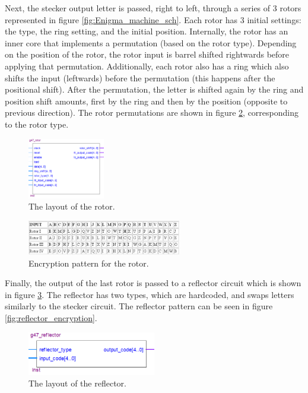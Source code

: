 \documentclass[10pt]{article}
\begin{document}
\newline
Next, the stecker output letter is passed, right to left, through a series of 3 rotors represented in figure \ref{fig:Enigma_machine_sch}. Each rotor has 3 initial settings: the type, the ring setting, and the initial position. Internally, the rotor has an inner core that implements a permutation (based on the rotor type). Depending on the position of the rotor, the rotor input is barrel shifted rightwards before applying that permutation. Additionally, each rotor also has a ring which also shifts the input (leftwards) before the permutation (this happens after the positional shift). After the permutation, the letter is shifted again by the ring and position shift amounts, first by the ring and then by the position (opposite to previous direction). The rotor permutations are shown in figure \ref{fig:rotor_encryption}, corresponding to the rotor type.
\begin{figure}[!htb]
    \centering
    \includegraphics[width=0.3\textwidth]{./rotor_layout.png}
    \caption{The layout of the rotor.}
    \label{fig:rotor_layout}
\end{figure}
\begin{figure}[!htb]
    \centering
    \includegraphics[width=0.6\textwidth]{./rotor_encryption.png}
    \caption{Encryption pattern for the rotor.}
    \label{fig:rotor_encryption}
\end{figure}
\newpage
Finally, the output of the last rotor is passed to a reflector circuit which is shown in figure \ref{fig:reflector_layout}. The reflector has two types, which are hardcoded, and swaps letters similarly to the stecker circuit. The reflector pattern can be seen in figure \ref{fig:reflector_encryption}.
\begin{figure}[!htb]
    \centering
    \includegraphics[width=0.5\textwidth]{./reflector_layout.png}
    \caption{The layout of the reflector.}
    \label{fig:reflector_layout}
\end{figure}
\end{document}
